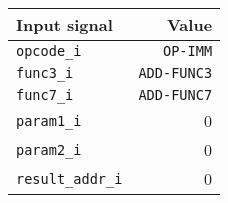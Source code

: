 {
\footnotesize
\begin{tabular}{|l|r|}
  \hline
  \cellcolor{gray!20}\textbf{Input signal} & \cellcolor{gray!20}\textbf{Value} \\
  \hline
  \texttt{opcode\_i} & \texttt{OP-IMM} \\
  \hline
  \texttt{func3\_i} & \texttt{ADD-FUNC3} \\
  \hline
  \texttt{func7\_i} & \texttt{ADD-FUNC7} \\
  \hline
  \texttt{param1\_i} & 0 \\
  \hline
  \texttt{param2\_i} & 0 \\
  \hline
  \texttt{result\_addr\_i} & 0 \\
  \hline
\end{tabular}
}
